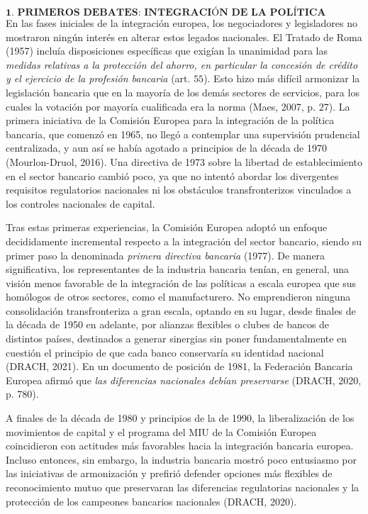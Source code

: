 \documentclass[10pt,a4paper]{article}
\begin{document}
{$$\textbf{1. PRIMEROS DEBATES: INTEGRACIÓN DE LA POLÍTICA BANCARIA EUROPEA}$$
En las fases iniciales de la integración europea, los negociadores y legisladores no mostraron ningún interés en alterar estos legados nacionales. El Tratado de Roma (1957) incluía disposiciones específicas que exigían la unanimidad para las \textit{medidas relativas a la protección del ahorro, en particular la concesión de crédito y el ejercicio de la profesión bancaria} (art. $55$). Esto hizo más difícil armonizar la legislación bancaria que en la mayoría de los demás sectores de servicios, para los cuales la votación por mayoría cualificada era la norma (Maes, 2007, p. 27). La primera iniciativa de la Comisión Europea para la integración de la política bancaria, que comenzó en 1965, no llegó a contemplar una supervisión prudencial centralizada, y aun así se había agotado a principios de la década de 1970 (Mourlon-Druol, 2016). Una directiva de 1973 sobre la libertad de establecimiento en el sector bancario cambió poco, ya que no intentó abordar los divergentes requisitos regulatorios nacionales ni los obstáculos transfronterizos vinculados a los controles nacionales de capital.

Tras estas primeras experiencias, la Comisión Europea adoptó un enfoque decididamente incremental respecto a la integración del sector bancario, siendo su primer paso la denominada \textit{primera directiva bancaria} (1977). De manera significativa, los representantes de la industria bancaria tenían, en general, una visión menos favorable de la integración de las políticas a escala europea que sus homólogos de otros sectores, como el manufacturero. No emprendieron ninguna consolidación transfronteriza a gran escala, optando en su lugar, desde finales de la década de 1950 en adelante, por alianzas flexibles o clubes de bancos de distintos países, destinados a generar sinergias sin poner fundamentalmente en cuestión el principio de que cada banco conservaría su identidad nacional (DRACH, 2021). En un documento de posición de 1981, la Federación Bancaria Europea afirmó que \textit{las diferencias nacionales debían preservarse} (DRACH, 2020, p. 780). 

A finales de la década de 1980 y principios de la de 1990, la liberalización de los movimientos de capital y el programa del MIU de la Comisión Europea coincidieron con actitudes más favorables hacia la integración bancaria europea. Incluso entonces, sin embargo, la industria bancaria mostró poco entusiasmo por las iniciativas de armonización y prefirió defender opciones más flexibles de reconocimiento mutuo que preservaran las diferencias regulatorias nacionales y la protección de los campeones bancarios nacionales (DRACH, 2020).

}
\end{document}
